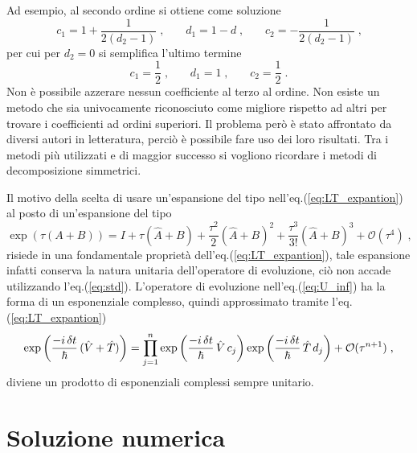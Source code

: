 \documentclass[12pt]{report}
\begin{document}
Ad esempio, al secondo ordine si ottiene come soluzione
\begin{equation}
    c_{1} = 1 + \frac{1}{2(d_{2} -1)}  \; \text{,} \qquad  d_{1} = 1 -d  \; \text{,} \qquad c_{2} = - \frac{1}{2(d_{2}-1)}  \; \text{,} 
    \label{eq:2_order_sol}
\end{equation}
per cui per $d_2 = 0$ si semplifica l'ultimo termine
\begin{equation}
    c_{1} = \frac{1}{2} \; \text{,}  \qquad 
    d_{1} = 1 \; \text{,}  \qquad
    c_{2} = \frac{1}{2}  \; \text{.}
\end{equation}
Non è possibile azzerare nessun coefficiente al terzo al ordine.
Non esiste un metodo che sia univocamente riconosciuto come migliore rispetto ad altri per trovare i coefficienti ad ordini superiori. Il problema però è stato affrontato da diversi autori in letteratura, perciò è possibile fare uso dei loro risultati. Tra i metodi più utilizzati e di maggior successo si vogliono ricordare i metodi di decomposizione simmetrici\cite{Barthel:high_orders}.

Il motivo della scelta di usare un'espansione del tipo nell'eq.(\ref{eq:LT_expantion}) al posto di un'espansione del tipo 
\begin{equation}
         \exp \left(\tau ({A} + {B})\right) = I + \tau(\hat{A} + B) + \frac{\tau^{2}}{2} (\hat{A} + B)^2 + \frac{\tau^{3}}{3!} (\hat{A} + B)^3 + \mathcal{O}(\tau^{4})  \; \text{,} 
    \label{eq:std}
\end{equation}
risiede in una fondamentale proprietà dell'eq.(\ref{eq:LT_expantion}), tale espansione infatti conserva la natura unitaria dell'operatore di evoluzione, ciò non accade utilizzando l'eq.(\ref{eq:std})\cite{Hatano:exp}.
L'operatore di evoluzione nell'eq.(\ref{eq:U_inf}) ha la forma di un esponenziale complesso, quindi approssimato tramite l'eq.(\ref{eq:LT_expantion}) 
\begin{equation}
    \centering
     \exp \left(\frac{-i \, \delta t }{\hbar}  \, (\hat{V} + \hat{T})\right)   = \prod _{j=1} ^{n}  \exp \left(\frac{-i \, \delta t }{\hbar} \, \hat{V} \, c_{j}\right)   \exp \left(\frac{-i \, \delta t }{\hbar} \, \hat{T} \, d_{j}\right) + \mathcal{O}(\tau^{n+1}) \; \text{,}
    \label{eq:sim_exp}
\end{equation}
diviene un prodotto di esponenziali complessi sempre unitario.

\section{Soluzione numerica} %
\label{sec:disc}
\end{document}
